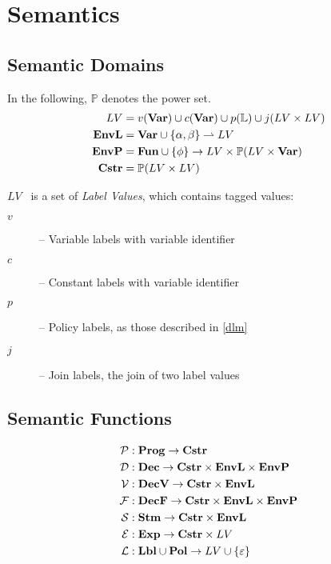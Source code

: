 
\newcommand{\iP}{\mathcal{P}}
\newcommand{\iD}{\mathcal{D}}
\newcommand{\iV}{\mathcal{V}}
\newcommand{\iF}{\mathcal{F}}
\newcommand{\iS}{\mathcal{S}}
\newcommand{\iE}{\mathcal{E}}
\newcommand{\iL}{\mathcal{L}}
\newcommand{\iO}{\mathcal{O}}

\newcommand{\iLV}{LV}

\newcommand{\dblSq}[1]{[\![ #1 ]\!]}

\newcommand{\rspace}{\\[1em]}
\newcommand{\dsWhere}[1]{\quad \text{ where } #1}
\newcommand{\dsAnd}[1]{\quad \text{ and } #1}
\newcommand{\dsIf}[1]{\quad \text{ if } #1}

\section{Semantics}

\subsection{Semantic Domains}
In the following, $\mathbb P$ denotes the power set.
\begin{align*}
\iLV      & = v(\iVar) \cup c(\iVar) \cup p(\mathbb{L}) \cup j(\iLV \times \iLV) \\
\iEnvL  & = \iVar \cup \{ \ia, \ib \} \rightharpoonup \iLV \\
\iEnvP  & = \iFun \cup \{ \ifb \} \rightarrow \iLV \times \mathbb P (\iLV \times \iVar) \\
\iCstr  & = \mathbb P (\iLV \times \iLV)
\end{align*}

$\iLV$~ is a set of \emph{Label Values}, which contains tagged values:
\begin{description}
  \item[$v$] -- Variable labels with variable identifier
  \item[$c$] -- Constant labels with variable identifier
  \item[$p$] -- Policy labels, as those described in \cref{dlm}
  \item[$j$] -- Join labels, the join of two label values
\end{description}

\subsection{Semantic Functions}
\begin{align*}
\iP & : \iProg \rightarrow \iCstr \\
\iD & : \iDec \rightarrow \iCstr \times \iEnvL \times \iEnvP \\
\iV & : \iDecv \rightarrow \iCstr \times \iEnvL \\
\iF & : \iDecf \rightarrow \iCstr \times \iEnvL \times \iEnvP \\
\iS & : \iStm \rightarrow \iCstr \times \iEnvL \\
\iE & : \iExp \rightarrow \iCstr \times \iLV \\
\iL & : \iLbl \cup \iPol \rightarrow \iLV \cup \{ \varepsilon \}
\end{align*}

